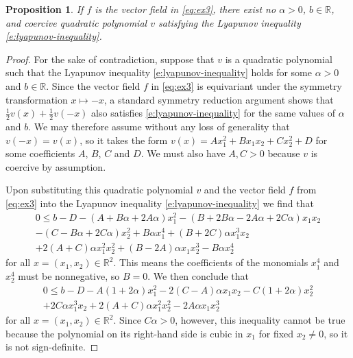 \documentclass[11pt]{amsart}
\numberwithin{equation}{section}
\theoremstyle{plain}
\newtheorem{proposition}{Proposition}[section]
\theoremstyle{definition}
\theoremstyle{remark}
\newcommand{\R}{\mathbb{R}}
\renewcommand{\vec}[1]{{#1}}
\begin{document}
\begin{proposition}
    If $f$ is the vector field in \cref{eq:ex3}, there exist no $\alpha>0$, $b\in \R$, and coercive quadratic polynomial $v$ satisfying the Lyapunov inequality \cref{e:lyapunov-inequality}.
\end{proposition} 
\begin{proof}
    For the sake of contradiction, suppose that $v$ is a quadratic polynomial such that the Lyapunov inequality \cref{e:lyapunov-inequality} holds for some $\alpha>0$ and $b\in\R$.
    Since the vector field $\vec{f}$ in \cref{eq:ex3} is equivariant under the symmetry transformation $x\mapsto -x$, a standard symmetry reduction argument shows that $\frac12 v(\vec{x})+ \frac12v(-\vec{x})$ also satisfies \cref{e:lyapunov-inequality} for the same values of $\alpha$ and $b$. We may therefore assume without any loss of generality that $v(-\vec{x})=v(\vec{x})$, so it takes the form
    $v(x) = A x_1^2 + B x_1 x_2 + C x_2^2 + D$ 
    for some coefficients $A$, $B$, $C$ and $D$. We must also have $A,C>0$ because $v$ is coercive by assumption.
    
    Upon substituting this quadratic polynomial $v$ and the vector field $\vec{f}$ from \cref{eq:ex3} into the Lyapunov inequality \cref{e:lyapunov-inequality} we find that
    \begin{align*}
        0\leq 
        b - D
        - (A + B\alpha +2A\alpha)x_1^2 
        - (B+2B\alpha-2A\alpha+2C\alpha)x_1 x_2
        \\
        - (C - B\alpha +2C\alpha) x_2^2 
        + B\alpha x_1^4 
        + (B + 2C)\alpha x_1^3 x_2
        \\
        + 2(A+C)\alpha x_1^2 x_2^2
        + (B - 2A)\alpha x_1 x_2^3
        - B \alpha x_2^4
    \end{align*}
    for all $\vec{x}=(x_1,x_2)\in\R^2$.
    This means the coefficients of the monomials $x_1^4$ and $x_2^4$ must be nonnegative, so $B=0$. We then conclude that
    \begin{align*}
        0\leq 
        b - D
        - A(1 +2\alpha)x_1^2 
        - 2(C-A)\alpha x_1 x_2
        - C(1 +2\alpha) x_2^2 \\
        + 2C\alpha x_1^3 x_2
        + 2(A+C)\alpha x_1^2 x_2^2
        - 2A\alpha x_1 x_2^3
    \end{align*}
    for all $\vec{x}=(x_1,x_2)\in\R^2$. Since $C\alpha>0$, however,
    this inequality cannot be true because the polynomial on its right-hand side is cubic in $x_1$ for fixed $x_2\neq 0$, so it is not sign-definite.
\end{proof}
\end{document}

